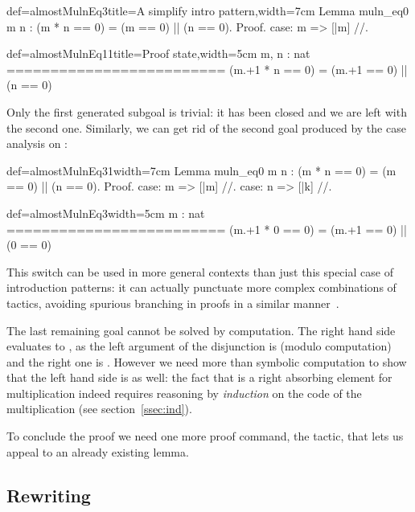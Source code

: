 \begin{coq}{def=almostMulnEq3}{title=A simplify intro pattern,width=7cm}
Lemma muln_eq0 m n :
  (m * n == 0) = (m == 0) || (n == 0).
Proof.
case: m => [|m] //.
\end{coq}
\begin{coqout}{def=almostMulnEq11}{title=Proof state,width=5cm}
m, n : nat
=========================
(m.+1 * n == 0) =
  (m.+1 == 0) || (n == 0)
\end{coqout}

Only the first generated subgoal is trivial: it has been closed and
we are left with the second one. Similarly, we can get rid of the
second goal produced by the case analysis on :

\begin{coq}{def=almostMulnEq31}{width=7cm}
Lemma muln_eq0 m n :
  (m * n == 0) = (m == 0) || (n == 0).
Proof.
case: m => [|m] //.
case: n => [|k] //.
\end{coq}
\begin{coqout}{def=almostMulnEq3}{width=5cm}
m : nat
=========================
(m.+1 * 0 == 0) =
  (m.+1 == 0) || (0 == 0)
\end{coqout}

This \C{//} switch can be used in
more general contexts than just this special case of introduction patterns:
it can actually punctuate more complex combinations of tactics,
avoiding spurious branching in proofs in a similar
manner~\cite[section 5.4]{ssrman}.

The last remaining goal cannot be solved by computation.
The right hand side evaluates to
, as the left argument of the disjunction is  (modulo
computation) and the right one is . However we need
more than symbolic computation to show that the left hand side is
 as well: the fact that  is a right absorbing element for
multiplication indeed requires reasoning by \emph{induction} on the
code of the multiplication (see section~\ref{ssec:ind}).

To conclude the proof we need one more proof command, the
 tactic, that lets us appeal to an already existing lemma.


\subsection{Rewriting}\label{ssec:rw}

